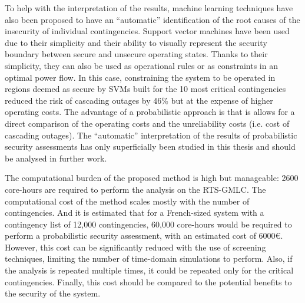 To help with the interpretation of the results, machine learning techniques have also been proposed to have an ``automatic'' identification of the root causes of the insecurity of individual contingencies. Support vector machines have been used due to their simplicity and their ability to visually represent the security boundary between secure and unsecure operating states. Thanks to their simplicity, they can also be used as operational rules or as constraints in an optimal power flow. In this case, constraining the system to be operated in regions deemed as secure by SVMs built for the 10 most critical contingencies reduced the risk of cascading outages by 46\% but at the expense of higher operating costs. The advantage of a probabilistic approach is that is allows for a direct comparison of the operating costs and the unreliability costs (i.e. cost of cascading outages). The ``automatic'' interpretation of the results of probabilistic security assessments has only superficially been studied in this thesis and should be analysed in further work.

The computational burden of the proposed method is high but manageable: 2600 core-hours are required to perform the analysis on the RTS-GMLC. The computational cost of the method scales mostly with the number of contingencies. And it is estimated that for a French-sized system with a contingency list of 12,000 contingencies, 60,000 core-hours would be required to perform a probabilistic security assessment, with an estimated cost of 6000€. However, this cost can be significantly reduced with the use of screening techniques, limiting the number of time-domain simulations to perform. Also, if the analysis is repeated multiple times, it could be repeated only for the critical contingencies. Finally, this cost should be compared to the potential benefits to the security of the system.
